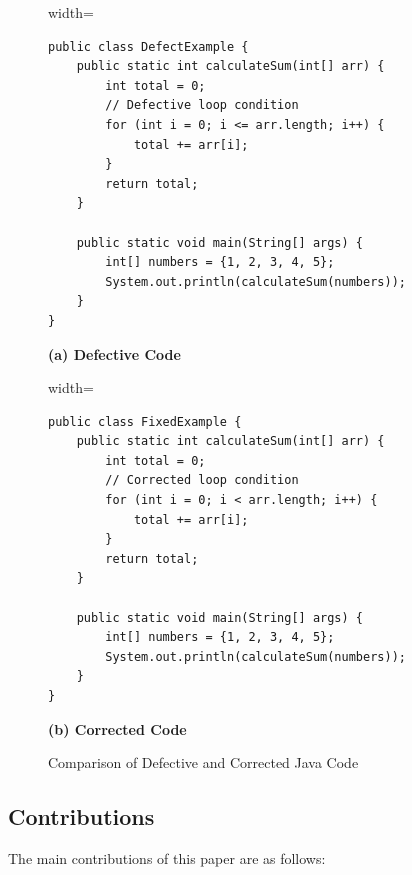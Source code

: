 \documentclass[authoryear,final,5p,times,twocolumn]{elsarticle}
\theoremstyle{plain}
\begin{document}
\setcounter{figure}{0}
\begin{figure}[!htbp]
    
    \begin{minipage}[t]{0.95\columnwidth}

     \label{fig:defect}   
        
        \begin{adjustbox}{width=\columnwidth}
            \begin{lstlisting}[style=javaColored, basicstyle=\ttfamily\footnotesize]
public class DefectExample {
    public static int calculateSum(int[] arr) {
        int total = 0;
        // Defective loop condition
        for (int i = 0; i <= arr.length; i++) {
            total += arr[i];
        }
        return total;
    }

    public static void main(String[] args) {
        int[] numbers = {1, 2, 3, 4, 5};
        System.out.println(calculateSum(numbers));
    }
}
            \end{lstlisting}
        \end{adjustbox}
        \centering
        \textbf{(a) Defective Code}
    \end{minipage}
    \hfill
    \begin{minipage}[t]{0.95\columnwidth}
        
       \label{fig:fixed} 
        \begin{adjustbox}{width=\columnwidth}
            \begin{lstlisting}[style=javaColored, basicstyle=\ttfamily\footnotesize]
public class FixedExample {
    public static int calculateSum(int[] arr) {
        int total = 0;
        // Corrected loop condition
        for (int i = 0; i < arr.length; i++) {
            total += arr[i];
        }
        return total;
    }

    public static void main(String[] args) {
        int[] numbers = {1, 2, 3, 4, 5};
        System.out.println(calculateSum(numbers));
    }
}
            \end{lstlisting}
        \end{adjustbox}
        \centering
        \textbf{(b) Corrected Code}
    \end{minipage}
    \centering
    \caption{Comparison of Defective and Corrected Java Code}
    \label{fig:compare}
\end{figure}

\subsection{Contributions}
The main contributions of this paper are as follows: 
\end{document}
